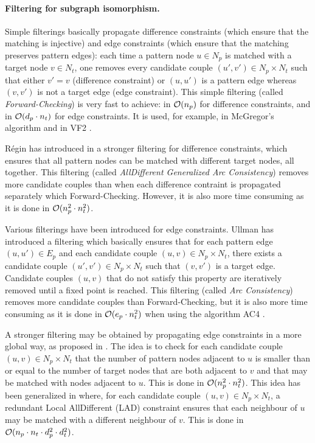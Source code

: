 \documentclass{llncs}
\begin{document}
\paragraph{Filtering for subgraph isomorphism.}

Simple filterings basically propagate difference constraints (which ensure that the matching is injective) and edge constraints (which ensure that the matching preserves pattern edges): each time a pattern node $u\in N_p$ is matched with a target node $v\in N_t$, one removes every candidate couple $(u',v')\in N_p\times N_t$ such that either $v'=v$ (difference constraint) or $(u,u')$ is a pattern edge whereas $(v,v')$ is not a target edge (edge constraint). This simple filtering (called {\em Forward-Checking}) is very fast to achieve: in ${\cal O}(n_p)$ for difference constraints, and in ${\cal O}(d_p\cdot n_t)$ for edge constraints. It is used, for example, in McGregor's algorithm \cite{mcgregor79} and in VF2 \cite{Cordella:2004}.

R\'egin has introduced in \cite{regin} a stronger filtering for difference constraints, which ensures that all pattern nodes can be matched with different target nodes, all together. This filtering (called {\em AllDifferent Generalized Arc Consistency}) removes more candidate couples than when each difference contraint is propagated separately which Forward-Checking. However, it is also more time consuming as it is done in ${\cal O}(n_p^2\cdot n_t^2)$.

Various filterings have been introduced for edge constraints. Ullman \cite{ullman} has introduced a filtering which basically ensures that for each pattern edge $(u,u')\in E_p$ and each candidate couple $(u,v)\in N_p\times N_t$, there exists a candidate couple $(u',v')\in N_p\times N_t$ such that $(v,v')$ is a target edge. Candidate couples $(u,v)$ that do not satisfy this property are iteratively removed until a fixed point is reached. This filtering (called {\em Arc Consistency}) removes more candidate couples than Forward-Checking, but it is also more time consuming as it is done in ${\cal O}(e_p\cdot n_t^2)$ when using the algorithm AC4  \cite{MH86}.

A stronger filtering may be obtained by propagating edge constraints in a more global way, as proposed in \cite{LV02}. The idea is to check for each candidate couple $(u,v)\in N_p\times N_t$ that the number of pattern nodes adjacent to $u$ is smaller than or equal to the number of target nodes that are both adjacent to $v$ and that may be matched with nodes adjacent to $u$. This is done in ${\cal O}(n_p^2\cdot n_t^2)$. This idea has been generalized in \cite{Solnon:2010} where, for each candidate couple $(u,v)\in N_p\times N_t$, a redundant Local AllDifferent (LAD) constraint ensures that each neighbour of $u$ may be matched with a different neighbour of $v$. This is done in ${\cal O}(n_p\cdot n_t\cdot d_p^2\cdot d_t^2)$.
\end{document}
